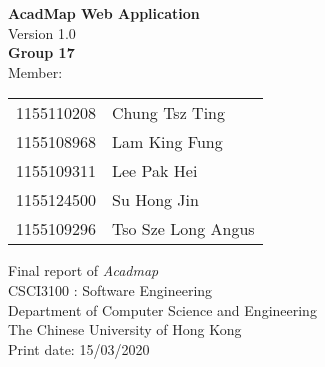 \documentclass[12pt,titlepage]{article}
\begin{document}
\setcounter{tocdepth}{4}\textbf{}
\thispagestyle{empty}
   \begin{center}
       \vspace*{1cm}
       \textbf{\Huge{AcadMap Web Application}}\\
       \vspace{0.5cm}
        \large{Version 1.0}\\
       \vspace{1.5cm}
       \textbf{\LARGE{Group 17}}
       \vspace{0.5cm}\\
       Member:\vspace{0.25cm}\\\phantom{Menber}
       \begin{tabular}{rl}
        1155110208&Chung Tsz Ting\\
        1155108968&Lam King Fung\\
        1155109311&Lee Pak Hei\\
        1155124500&Su Hong Jin\\
        1155109296&Tso Sze Long Angus\\
        \end{tabular}
       \vfill
       Final report of \textit{Acadmap}
       \vspace{0.8cm}\\
       CSCI3100 : Software Engineering\\
       Department of Computer Science and Engineering\\
       The Chinese University of Hong Kong\\
       Print date: 15/03/2020
            
   \end{center}
\newpage
\tableofcontents
\newpage
\end{document}
